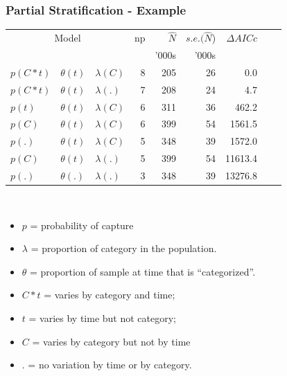 \documentclass{beamer}
\begin{document}
\begin{frame} \frametitle{Partial Stratification - Example}
\vspace{3pt}

\begin{tabular}{lllrrrrrr}\hline 
\multicolumn{3}{c}{Model}                        & np  &$\hat{N}$  &$s.e.(\hat{N}$) &$\Delta AICc$ \\
                 &                   &                        &        &         '000s       & '000s & \\  \hline
 $p(C*t)$  & $\theta(t)$ & $\lambda(C) $  & 8    &      205  & 26     &        0.0\\ 
$p(C*t)$   & $\theta(t)$ & $\lambda(.)$     & 7    &      208  & 24    &        4.7\\ 
$p(t)$       & $\theta(t)$ & $\lambda(C)$     & 6     &     311   & 36   &    462.2 \\
$p(C)$     & $\theta(t)$ &  $\lambda(C)$   & 6    &      399  & 54    &   1561.5\\ 
 $p(.)$      & $\theta(t)$ & $\lambda(C)$   & 5    &      348  & 39    &   1572.0\\ 
 $p(C)$     & $\theta(t)$ & $\lambda(.)$     & 5    &     399  & 54    &  11613.4\\
 $p(.)$      & $\theta(.)$ & $\lambda(.)$     & 3    &     348  & 39    &  13276.8\\ \hline
 \end{tabular}\\
\begin{itemize}
\item $p$ = probability of capture 
\item $\lambda$ = proportion of category in the population.
\item $\theta$ = proportion of sample at time that is ``categorized''.
\item $C*t$ = varies by category and time; 
\item $t$ = varies by time but not category;
\item $C$ = varies by category but not by time
\item $.$ = no variation by time or by category.
\end{itemize} 
\end{frame}
\end{document}
